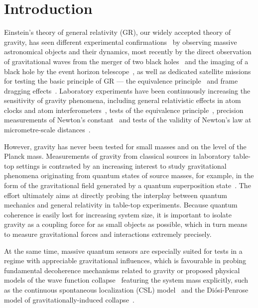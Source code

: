 \documentclass[pdflatex,sn-mathphys,12pt]{sn-jnl}
\begin{document}
\section{Introduction}\label{sec1}
    Einstein’s theory of general relativity (GR), our widely accepted theory of gravity, has seen different experimental confirmations~\cite{Einstein1916,walsh1979} by observing massive astronomical objects and their dynamics, most recently by the direct observation of gravitational waves from the merger of two black holes~\cite{abbott2016} and the imaging of a black hole by the event horizon telescope~\cite{akiyama2019}, as well as dedicated satellite missions for testing the basic principle of GR --- the equivalence principle~\cite{touboul2017} and frame dragging effects~\cite{everitt2011}. Laboratory experiments have been continuously increasing the sensitivity of gravity phenomena, including general relativistic effects in atom clocks and atom interferometers~\cite{bothwell2022,asenbaum2017}, tests of the equivalence principle~\cite{rosi2017,asenbaum2020}, precision measurements of Newton's constant~\cite{rosi2014,quinn2013} and tests of the validity of Newton's law at micrometre-scale distances~\cite{geraci2008,tan2020}. 
    
    However, gravity has never been tested for small masses and on the level of the Planck mass. Measurements of gravity from classical sources in laboratory table-top settings is contrasted by an increasing interest to study gravitational phenomena originating from quantum states of source masses, for example, in the form of the gravitational field generated by a quantum superposition state~\cite{bronstein2012republication,rickles2011role,bose2017,marletto2017,al2018optomechanical}. The effort ultimately aims at directly probing the interplay between quantum mechanics and general relativity in table-top experiments. Because quantum coherence is easily lost for increasing system size, it is important to isolate gravity as a coupling force for as small objects as possible, which in turn means to measure gravitational forces and interactions extremely precisely. 

    At the same time, massive quantum sensors are especially suited for tests in a regime with appreciable gravitational influences, which is favourable in probing fundamental decoherence mechanisms related to gravity \cite{R1,R2} or proposed  physical models of the wave function collapse~\cite{diosi2015,vinante2016,bassi2013} featuring the system mass explicitly, such as the continuous spontaneous localization (CSL) model~\cite{ghirardi1990} and the Di\'{o}si-Penrose model of gravitationally-induced collapse~\cite{diosi1987,penrose1996,oosterkamp2013}.
    
\end{document}
